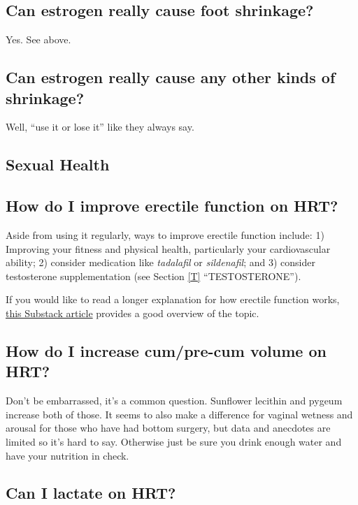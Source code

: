 \documentclass{article}
\begin{document}
{{\subsection{Can estrogen really cause foot shrinkage?}

Yes. See above.

\subsection{Can estrogen really cause any other kinds of shrinkage?}

Well, “use it or lose it” like they always say.

\subsection*{Sexual Health}

\subsection{How do I improve erectile function on HRT?}\label{11-20}

Aside from using it regularly, ways to improve erectile function include: 1) Improving your fitness and physical health, particularly your cardiovascular ability; 2) consider medication like \textit{tadalafil} or \textit{sildenafil}; and 3) consider testosterone supplementation (see Section \ref{T} “TESTOSTERONE”).

If you would like to read a longer explanation for how erectile function works, \href{https://stainedglasswoman.substack.com/p/how-to-maintain-your-penis-function}{this Substack article} provides a good overview of the topic.

\subsection{How do I increase cum/pre-cum volume on HRT?}

Don’t be embarrassed, it’s a common question. Sunflower lecithin and pygeum increase both of those. It seems to also make a difference for vaginal wetness and arousal for those who have had bottom surgery, but data and anecdotes are limited so it’s hard to say. Otherwise just be sure you drink enough water and have your nutrition in check.

\subsection{Can I lactate on HRT?}

}}
\end{document}
